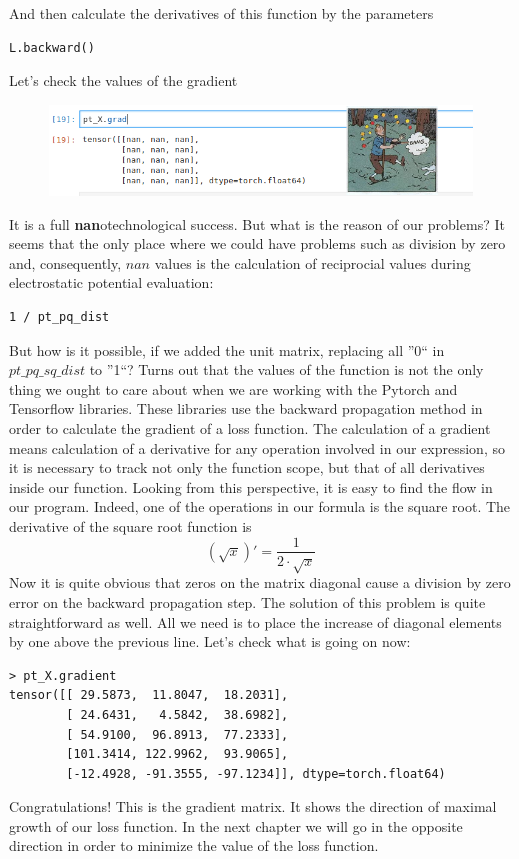 \documentclass[12pt]{extarticle}
\begin{document}
%
And then calculate the derivatives of this function by the parameters
%
\begin{lstlisting}[frame=single]
L.backward()
\end{lstlisting}
%
Let's check the values of the gradient
\begin{figure}[h]
\centering\includegraphics[width=.99\hsize]{pics/rakes_grad.png}
\end{figure}

It is a full \textbf{nan}otechnological success.
%
But what is the reason of our problems?
%
It seems that the only place where we could have problems such as division by zero and, consequently,
\(nan\) values is the calculation of reciprocial
values during electrostatic potential evaluation:
\begin{lstlisting}[frame=single]
1 / pt_pq_dist
\end{lstlisting}
%
But how is it possible, if we added the unit matrix, replacing all
''0`` in \(pt\_pq\_sq\_dist\) to ''1``?
%
Turns out that the values of the function is not the only
thing we ought to care about when we are working  %
with the Pytorch and Tensorflow libraries.
%
These libraries use the backward propagation method in order
to calculate the gradient of a loss function.
%
The calculation of a gradient means calculation of a derivative  %
for any operation involved in our expression, so it is
necessary to track not only the function scope, but
that of all derivatives inside our function.
%
Looking from this perspective, it is easy to find
the flow in our program.
%
Indeed, one of the operations in our formula is
the square root.
%
The derivative of the square root function is
\begin{equation}
 \left ( \sqrt x \right )' = \frac 1 {2\cdot \sqrt x}
\end{equation}
%
Now it is quite obvious that zeros on the matrix diagonal
cause a division by zero error on the backward propagation step.
%
The solution of this problem is quite straightforward as well.
%
All we need is to place the increase of diagonal elements by one
above the previous line.
%
Let's check what is going on now:
\begin{lstlisting}[frame=single]
 > pt_X.gradient
tensor([[ 29.5873,  11.8047,  18.2031],
        [ 24.6431,   4.5842,  38.6982],
        [ 54.9100,  96.8913,  77.2333],
        [101.3414, 122.9962,  93.9065],
        [-12.4928, -91.3555, -97.1234]], dtype=torch.float64)
\end{lstlisting}
%
Congratulations!
%
This is the gradient matrix. 
%
It shows the direction of maximal growth of our loss function.
%
In the next chapter we will go in the opposite direction 
in order to minimize the value of the loss function.
\end{document}
